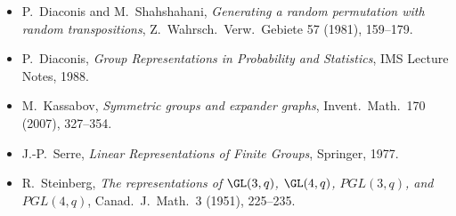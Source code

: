 \begin{itemize}
  \item P.\ Diaconis and M.\ Shahshahani, \emph{Generating a random permutation with random transpositions}, Z.\ Wahrsch.\ Verw.\ Gebiete 57 (1981), 159--179.
  \item P.\ Diaconis, \emph{Group Representations in Probability and Statistics}, IMS Lecture Notes, 1988.
  \item M.\ Kassabov, \emph{Symmetric groups and expander graphs}, Invent.\ Math.\ 170 (2007), 327--354.
  \item J.-P.\ Serre, \emph{Linear Representations of Finite Groups}, Springer, 1977.
  \item R.\ Steinberg, \emph{The representations of $\GL(3, q)$, $\GL(4, q)$, $PGL(3, q)$, and $PGL(4, q)$}, Canad.\ J.\ Math.\ 3 (1951), 225--235.
\end{itemize}
